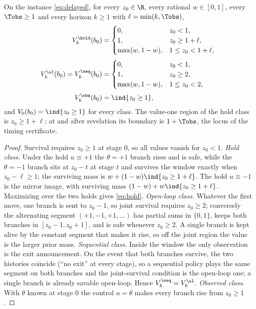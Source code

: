 \begin{theorem}\label{thm:closed}
On the instance \eqref{eq:delayed}, for every $z_0\in\R$, every rational $w\in[0,1]$, every $\Tobs\ge1$ and every horizon $k\ge1$ with $\ell=\min(k,\Tobs)$,
\begin{align}
V^{\hold}_k(b_0)&=\begin{cases}0,&z_0<1,\\ 1,&z_0\ge1+\ell,\\ \max(w,1-w),&1\le z_0<1+\ell,\end{cases}\label{eq:hold}\\[2pt]
V^{\ol}_k(b_0)=V^{\seq}_k(b_0)&=\begin{cases}0,&z_0<1,\\ 1,&z_0\ge2,\\ \max(w,1-w),&1\le z_0<2,\end{cases}\label{eq:ol}\\[2pt]
V^{\obs}_k(b_0)&=\ind{z_0\ge1},\label{eq:obs}
\end{align}
and $V_0(b_0)=\ind{z_0\ge1}$ for every class. The value-one region of the hold class is $z_0\ge1+\ell$; at and after revelation its boundary is $1+\Tobs$, the locus of the timing certificate.
\end{theorem}

\begin{proof}
Survival requires $z_0\ge1$ at stage $0$, so all values vanish for $z_0<1$. \emph{Hold class.} Under the hold $u\equiv+1$ the $\theta=+1$ branch rises and is safe, while the $\theta=-1$ branch sits at $z_0-t$ at stage $t$ and survives the window exactly when $z_0-\ell\ge1$; the surviving mass is $w+(1-w)\ind{z_0\ge1+\ell}$. The hold $u\equiv-1$ is the mirror image, with surviving mass $(1-w)+w\ind{z_0\ge1+\ell}$. Maximizing over the two holds gives \eqref{eq:hold}. \emph{Open-loop class.} Whatever the first move, one branch is sent to $z_0-1$, so joint survival requires $z_0\ge2$; conversely the alternating segment $(+1,-1,+1,\dots)$ has partial sums in $\{0,1\}$, keeps both branches in $[z_0-1,z_0+1]$, and is safe whenever $z_0\ge2$. A single branch is kept alive by the constant segment that makes it rise, so off the joint region the value is the larger prior mass. \emph{Sequential class.} Inside the window the only observation is the exit announcement. On the event that both branches survive, the two histories coincide (``no exit'' at every stage), so a sequential policy plays the same segment on both branches and the joint-survival condition is the open-loop one; a single branch is already savable open-loop. Hence $V^{\seq}_k=V^{\ol}_k$. \emph{Observed class.} With $\theta$ known at stage $0$ the control $u=\theta$ makes every branch rise from $z_0\ge1$.
\end{proof}

